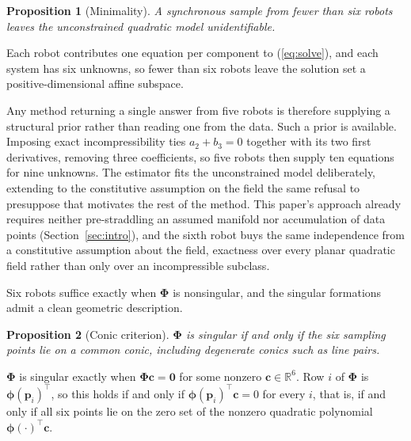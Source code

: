 \documentclass[lettersize,journal]{IEEEtran}
\newtheorem{proposition}{Proposition}
\begin{document}
\begin{proposition}[Minimality]
\label{prop:minimality}
A synchronous sample from fewer than six robots leaves the
unconstrained quadratic model unidentifiable.
\end{proposition}

\begin{IEEEproof}
Each robot contributes one equation per component to (\ref{eq:solve}),
and each system has six unknowns, so fewer than six robots leave the
solution set a positive-dimensional affine subspace.
\end{IEEEproof}

Any method returning a single answer from five robots is therefore
supplying a structural prior rather than reading one from the data. Such
a prior is available. Imposing exact incompressibility ties $a_2 + b_3 =
0$ together with its two first derivatives, removing three coefficients,
so five robots then supply ten equations for nine unknowns. The
estimator fits the unconstrained model deliberately, extending to the
constitutive assumption on the field the same refusal to presuppose
that motivates the rest of the method. This paper's approach already
requires neither pre-straddling an assumed manifold nor accumulation of
data points (Section~\ref{sec:intro}), and the sixth robot buys the same
independence from a constitutive assumption about the field, exactness
over every planar quadratic field rather than only over an incompressible
subclass.\label{rem:minimality_priors}

Six robots suffice exactly when $\boldsymbol{\Phi}$ is nonsingular, and
the singular formations admit a clean geometric description.

\begin{proposition}[Conic criterion]
\label{prop:conic}
$\boldsymbol{\Phi}$ is singular if and only if the six sampling points
lie on a common conic, including degenerate conics such as line pairs.
\end{proposition}

\begin{IEEEproof}
$\boldsymbol{\Phi}$ is singular exactly when
$\boldsymbol{\Phi}\mathbf{c} = \mathbf{0}$ for some nonzero
$\mathbf{c} \in \mathbb{R}^6$. Row $i$ of $\boldsymbol{\Phi}$ is
$\boldsymbol{\phi}(\mathbf{p}_i)^\top$, so this holds if and only if
$\boldsymbol{\phi}(\mathbf{p}_i)^\top \mathbf{c} = 0$ for every $i$,
that is, if and only if all six points lie on the zero set of the nonzero
quadratic polynomial $\boldsymbol{\phi}(\cdot)^\top \mathbf{c}$.
\end{IEEEproof}
\end{document}
